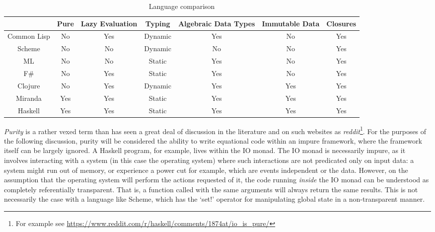 \documentclass[12pt, a4paper]{report}
\begin{document}
\begin{table}
    \resizebox{\textwidth}{!}
    {\begin{tabular}{|c|cccccc|}
        \hline
                    & Pure                    & Lazy Evaluation     & Typing                      & Algebraic Data Types     & Immutable Data          & Closures \\
        \hline
        Common Lisp & No                      & \cellcolor{LRed}Yes & Dynamic                     & \cellcolor{GoldenRod}Yes & No                      & \cellcolor{LRed}Yes \\
        Scheme      & No                      & No                  & Dynamic                     & No                       & No                      & \cellcolor{LRed}Yes \\
        ML          & No                      & No                  & \cellcolor{Lawngreen}Static & \cellcolor{GoldenRod}Yes & No                      & \cellcolor{LRed}Yes \\
        F\#         & No                      & \cellcolor{LRed}Yes & \cellcolor{Lawngreen}Static & \cellcolor{GoldenRod}Yes & No                      & \cellcolor{LRed}Yes \\
        Clojure     & No                      & \cellcolor{LRed}Yes & Dynamic                     & \cellcolor{GoldenRod}Yes & \cellcolor{Seagreen}Yes & \cellcolor{LRed}Yes \\
        Miranda     & \cellcolor{Seagreen}Yes & \cellcolor{LRed}Yes & \cellcolor{Lawngreen}Static & \cellcolor{GoldenRod}Yes & \cellcolor{Seagreen}Yes & \cellcolor{LRed}Yes \\
        Haskell     & \cellcolor{Seagreen}Yes & \cellcolor{LRed}Yes & \cellcolor{Lawngreen}Static & \cellcolor{GoldenRod}Yes & \cellcolor{Seagreen}Yes & \cellcolor{LRed}Yes \\
        \hline
    \end{tabular}}
    \caption{Language comparison}
    \label{tabel:langs}
\end{table}

\textit{Purity} is a rather vexed term than has seen a great deal of discussion in
the literature and on such websites as \textit{reddit}\footnote{For example see
\url{https://www.reddit.com/r/haskell/comments/1874at/io_is_pure/}}. For the purposes of the
following discussion, purity will be considered the ability to write equational code within an
impure framework, where the framework itself can be largely ignored. A Haskell program, for example,
lives within the IO monad. The IO monad is necessarily impure, as it involves interacting with
a system (in this case the operating system) where such interactions are not predicated only on
input data: a system might run out of memory, or experience a power cut for example, which are
events independent or the data. However, on the assumption that the operating system will perform
the actions requested of it, the code running \textit{inside} the IO monad can be understood as
completely referentially transparent. That is, a function called with the same arguments will always
return the same results. This is not necessarily the case with a language like Scheme, which has the
`set!' operator for manipulating global state in a non-transparent manner.
\end{document}
